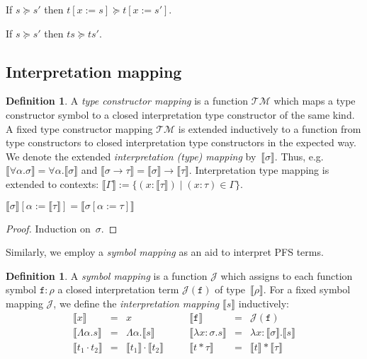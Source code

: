 \documentclass[a4paper,UKenglish,cleveref,autoref,numberwithinsect]{lipics-v2019}
\theoremstyle{definition}
\newtheorem{defn}[theorem]{Definition}
\newcommand{\arrtype}{\rightarrow}
\newcommand{\quant}[2]{\forall #1.#2}
\newcommand{\app}[2]{#1 \cdot #2}
\newcommand{\tapp}[2]{#1 * #2}
\newcommand{\subst}[2]{#1:=#2}
\newcommand{\abs}[2]{\lambda #1.#2}
\newcommand{\tabs}[2]{\Lambda #1.#2}
\newcommand{\typeinterpret}[1]{\llbracket #1 \rrbracket}
\newcommand{\interpret}[1]{\llbracket #1 \rrbracket}
\newcommand{\itp}[1]{\llbracket #1 \rrbracket}
\newcommand{\Typemap}{\mathcal{T\!M}}
\newcommand{\Termmap}{\mathcal{J}}
\begin{document}
\begin{lemma}\label{lem_succeq_subst}
  If $s \succeq s'$ then $t[\subst{x}{s}] \succeq t[\subst{x}{s'}]$.
\end{lemma}

\begin{corollary}\label{cor_app_wm}
  If $s \succeq s'$ then $t s \succeq t s'$.
\end{corollary}

\subsection{Interpretation mapping}

\begin{defn}
  A \emph{type constructor mapping} is a function $\Typemap$ which
  maps a type constructor symbol to a closed interpretation type
  constructor of the same kind. A fixed type constructor mapping
  $\Typemap$ is extended inductively to a function from type
  constructors to closed interpretation type constructors in the
  expected way. We denote the extended \emph{interpretation (type)
    mapping} by~$\typeinterpret{\sigma}$. Thus,
  e.g.~$\typeinterpret{\quant{\alpha}{\sigma}} =
  \quant{\alpha}{\typeinterpret{\sigma}}$ and $\typeinterpret{\sigma
    \arrtype \tau} = \typeinterpret{\sigma} \arrtype
  \typeinterpret{\tau}$. Interpretation type mapping is extended to
  contexts: \( \itp{\Gamma} := \{ (x : \typeinterpret{\tau}) \mid (x :
  \tau) \in \Gamma \}.  \)
\end{defn}

\begin{lemma}\label{lem:substitutioninterpret:types}
  $\typeinterpret{\sigma}[\alpha:=\typeinterpret{\tau}] =
  \typeinterpret{\sigma[\alpha:=\tau]}$
\end{lemma}

\begin{proof}
  Induction on~$\sigma$.
\end{proof}

Similarly, we employ a \emph{symbol mapping} as an aid to interpret
PFS terms.

\begin{defn}
  A \emph{symbol mapping} is a function $\Termmap$ which assigns to
  each function symbol $\mathtt{f} : \rho$ a closed interpretation
  term $\Termmap(\mathtt{f})$ of type~$\typeinterpret{\rho}$. For a
  fixed symbol mapping $\Termmap$, we define the \emph{interpretation
    mapping} $\interpret{s}$ inductively:
  \[
    \begin{array}{rclcrcl}
      \interpret{x} & = & x &\quad&
      \interpret{\mathtt{f}} &=& \Termmap(\mathtt{f}) \\
      \interpret{\tabs{\alpha}{s}} & = & \tabs{\alpha}{\interpret{s}} &\quad&
      \interpret{\abs{x:\sigma}{s}} & = & \abs{x:\typeinterpret{\sigma}}{
                                          \interpret{s}} \\
      \interpret{\app{t_1}{t_2}} &=& \app{\interpret{t_1}}{\interpret{t_2}} &\quad&
      \interpret{\tapp{t}{\tau}} &=& \tapp{\interpret{t}}{\typeinterpret{\tau}}
    \end{array}
  \]
\end{defn}
\end{document}
